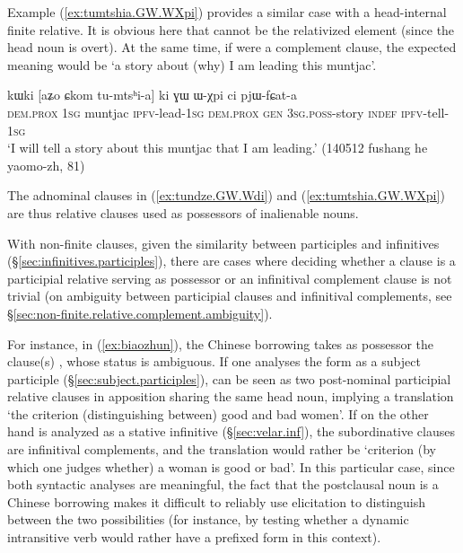 Example (\ref{ex:tumtshia.GW.WXpi}) provides a similar case with a head-internal finite relative. It is obvious here that  cannot be the relativized element (since the head noun  is overt). At the same time, if  were a complement clause, the expected meaning would be `a story about (why) I am leading this muntjac'. 

\begin{exe}
\ex  \label{ex:tumtshia.GW.WXpi}
\gll kɯki [aʑo ɕkom tu-mtsʰi-a] ki ɣɯ ɯ-χpi ci pjɯ-fɕat-a \\
\textsc{dem}.\textsc{prox} \textsc{1sg} muntjac \textsc{ipfv}-lead-\textsc{1sg} \textsc{dem}.\textsc{prox} \textsc{gen} \textsc{3sg}.\textsc{poss}-story \textsc{indef} \textsc{ipfv}-tell-\textsc{1sg} \\
\glt `I will tell a story about this muntjac that I am leading.' (140512 fushang he yaomo-zh, 81)
\end{exe}

The adnominal clauses in (\ref{ex:tundze.GW.Wdi}) and (\ref{ex:tumtshia.GW.WXpi}) are thus relative clauses used as possessors of inalienable nouns.

With non-finite clauses, given the similarity between participles and infinitives (§\ref{sec:infinitives.participles}), there are cases where deciding whether a clause is a participial relative serving as possessor or an infinitival complement clause is not trivial (on ambiguity between participial clauses and infinitival complements, see §\ref{sec:non-finite.relative.complement.ambiguity}). 

For instance, in (\ref{ex:biaozhun}), the Chinese borrowing   takes as possessor the clause(s) , whose status is ambiguous. If one analyses the form  as a subject participle (§\ref{sec:subject.participles}),  can be seen as two post-nominal participial relative clauses in apposition sharing the same head noun, implying a translation `the criterion (distinguishing between) good and bad women'. If on the other hand  is analyzed as a stative infinitive (§\ref{sec:velar.inf}), the subordinative clauses are infinitival complements, and the translation would rather be `criterion (by which one judges whether) a woman is good or bad'. In this particular case, since both syntactic analyses are meaningful, the fact that the postclausal noun is a Chinese borrowing makes it difficult to reliably use elicitation to distinguish between the two possibilities (for instance, by testing whether a dynamic intransitive verb would rather have a  prefixed form in this context).

